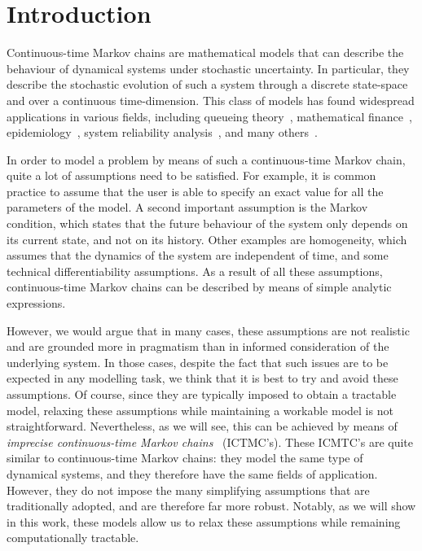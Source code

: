\documentclass[10pt,a4paper]{paper}
\theoremstyle{definition}
\begin{document}
\newpage
\section{Introduction}\label{sec:introduction}

Continuous-time Markov chains are mathematical models that can describe the behaviour of dynamical systems under stochastic uncertainty. In particular, they describe the stochastic evolution of such a system through a discrete state-space and over a continuous time-dimension. This class of models has found widespread applications in various fields, including queueing theory~\cite{asmussen2008applied,bolch2006queueing}, mathematical finance~\cite{elliott2013default, rolski2009stochastic,sass2004optimizing}, epidemiology~\cite{ duffy1995estimation,jackson2003multistate, lemey2009reconstructing}, system reliability analysis~\cite{besnard2010approach,gokhale2004analysis, wang2007reliability}, and many others~\cite{yin2012continuous}.

In order to model a problem by means of such a continuous-time Markov chain, quite a lot of assumptions need to be satisfied. %
For example, it is common practice to assume that the user is able to specify an exact value for all the parameters of the model.
A second important assumption is the Markov condition, which states that the future behaviour of the system only depends on its current state, and not on its history. Other examples are homogeneity, which assumes that the dynamics of the system are independent of time, and some technical differentiability assumptions. 
As a result of all these assumptions, continuous-time Markov chains can be described by means of simple analytic expressions. 


However, we would argue that in many cases, these assumptions are not realistic and are grounded more in pragmatism than in informed consideration of the underlying system. In those cases, despite the fact that such issues are to be expected in any modelling task, we think that it is best to try and avoid these assumptions. Of course, since they are typically imposed to obtain a tractable model, relaxing these assumptions while maintaining a workable model is not straightforward. 
Nevertheless, as we will see, this can be achieved by means of \emph{imprecise continuous-time Markov chains}~\cite{Skulj:2015cq,troffaes2015using} (ICTMC's). These ICMTC's are quite similar to continuous-time Markov chains: they model the same type of dynamical systems, and they therefore have the same fields of application. However, they do not impose the many simplifying assumptions that are traditionally adopted, and are therefore far more robust. Notably, as we will show in this work, these models allow us to relax these assumptions while remaining computationally tractable.
\end{document}
